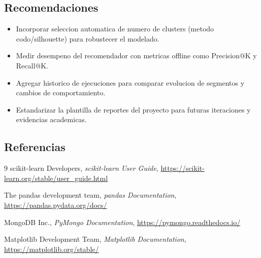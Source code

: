 ﻿\documentclass{article}
\begin{document}
\subsection{Recomendaciones}

\begin{itemize}
    \item Incorporar seleccion automatica de numero de clusters (metodo codo/silhouette) para robustecer el modelado.
    \item Medir desempeno del recomendador con metricas offline como Precision@K y Recall@K.
    \item Agregar historico de ejecuciones para comparar evolucion de segmentos y cambios de comportamiento.
    \item Estandarizar la plantilla de reportes del proyecto para futuras iteraciones y evidencias academicas.
\end{itemize}


\subsection{Referencias}

\begin{thebibliography}{9}
scikit-learn Developers,
\textit{scikit-learn User Guide},
\url{https://scikit-learn.org/stable/user_guide.html}

The pandas development team,
\textit{pandas Documentation},
\url{https://pandas.pydata.org/docs/}

MongoDB Inc.,
\textit{PyMongo Documentation},
\url{https://pymongo.readthedocs.io/}

Matplotlib Development Team,
\textit{Matplotlib Documentation},
\url{https://matplotlib.org/stable/}
\end{thebibliography}



\vfill
\end{document}

